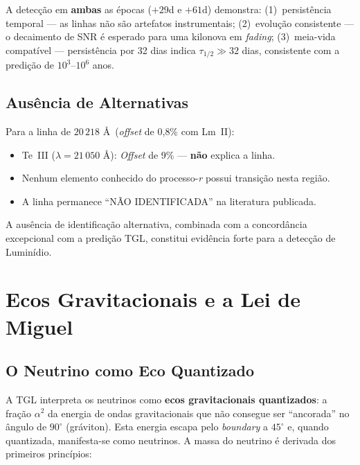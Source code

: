 \documentclass[12pt,a4paper,twoside]{article}
\newcommand{\alphaii}{\alpha^{2}}
\newcommand{\boundary}{\textit{boundary}}
\begin{document}
A detec\c{c}\~ao em \textbf{ambas} as \'epocas ($+29$d e $+61$d) demonstra: (1)~persist\^encia temporal --- as linhas n\~ao s\~ao artefatos instrumentais; (2)~evolu\c{c}\~ao consistente --- o decaimento de SNR \'e esperado para uma kilonova em \textit{fading}; (3)~meia-vida compat\'ivel --- persist\^encia por 32 dias indica $\tau_{1/2} \gg 32$ dias, consistente com a predi\c{c}\~ao de $10^3$--$10^6$ anos.


\subsection{Aus\^encia de Alternativas}

Para a linha de $20\,218$ \AA\ (\textit{offset} de 0{,}8\% com Lm~II):
\begin{itemize}[nosep]
\item Te~III ($\lambda = 21\,050$ \AA): \textit{Offset} de 9\% --- \textbf{n\~ao} explica a linha.
\item Nenhum elemento conhecido do processo-\textit{r} possui transi\c{c}\~ao nesta regi\~ao.
\item A linha permanece ``N\~AO IDENTIFICADA'' na literatura publicada.
\end{itemize}

A aus\^encia de identifica\c{c}\~ao alternativa, combinada com a concord\^ancia excepcional com a predi\c{c}\~ao TGL, constitui evid\^encia forte para a detec\c{c}\~ao de Lumin\'idio.


\section{Ecos Gravitacionais e a Lei de Miguel}


\subsection{O Neutrino como Eco Quantizado}

A TGL interpreta os neutrinos como \textbf{ecos gravitacionais quantizados}: a fra\c{c}\~ao $\alphaii$ da energia de ondas gravitacionais que n\~ao consegue ser ``ancorada'' no \^angulo de $90^\circ{}$ (gr\'aviton). Esta energia escapa pelo \boundary{} a $45^\circ$ e, quando quantizada, manifesta-se como neutrinos. A massa do neutrino \'e derivada dos primeiros princ\'ipios:
\end{document}
